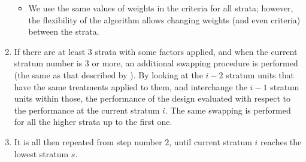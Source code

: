 \begin{enumerate}
\begin{itemize}
\item We use the same values of weights in the criteria for all strata; however, the flexibility of the algorithm allows changing weights (and even criteria) between the strata.
\end{itemize}
\item If there are at least $3$ strata with some factors applied, and when the current stratum number is $3$ or more, an additional swapping procedure is performed (the same as that described by \cite{Trinca2001multistratum}). By looking at the $i-2$ stratum units that have the same treatments applied to them, and interchange the $i-1$ stratum units within those, the performance of the design evaluated with respect to the performance at the current stratum $i$. The same swapping is performed for all the higher strata up to the first one.
\item It is all then repeated from step number $2$, until current stratum $i$ reaches the lowest stratum $s$. 
\end{enumerate}

